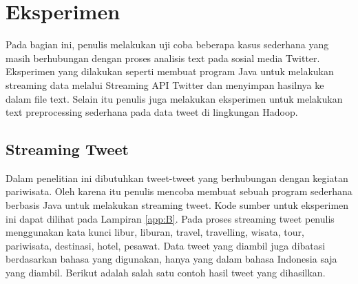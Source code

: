 \section{Eksperimen}
Pada bagian ini, penulis melakukan uji coba beberapa kasus sederhana yang masih berhubungan dengan proses analisis text pada sosial media Twitter. Eksperimen yang dilakukan seperti membuat program Java untuk melakukan streaming data melalui Streaming API Twitter dan menyimpan hasilnya ke dalam file text. Selain itu penulis juga melakukan eksperimen untuk melakukan text preprocessing sederhana pada data tweet di lingkungan Hadoop.

\subsection{Streaming Tweet}
Dalam penelitian ini dibutuhkan tweet-tweet yang berhubungan dengan kegiatan pariwisata. Oleh karena itu penulis mencoba membuat sebuah program sederhana berbasis Java untuk melakukan streaming tweet. Kode sumber untuk eksperimen ini dapat dilihat pada Lampiran \ref{app:B}. Pada proses streaming tweet penulis menggunakan kata kunci  libur, liburan, travel, travelling, wisata, tour, pariwisata, destinasi, hotel, pesawat. Data tweet yang diambil juga dibatasi berdasarkan bahasa yang digunakan, hanya yang dalam bahasa Indonesia saja yang diambil. Berikut adalah salah satu contoh hasil tweet yang dihasilkan.


